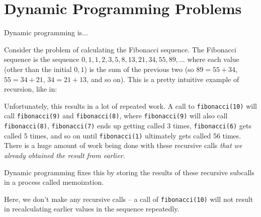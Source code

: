 \section{Dynamic Programming Problems}

Dynamic programming is...

Consider the problem of calculating the Fibonacci sequence. The Fibonacci sequence is the sequence $0,1,1,2,3,5,8,13,21,34,55,89,...$ where each value (other than the initial $0,1$) is the sum of the previous two (so $89 = 55 + 34$, $55 = 34 + 21$, $34 = 21 + 13$, and so on). This is a pretty intuitive example of recursion, like in:


Unfortunately, this results in a lot of repeated work. A call to \texttt{fibonacci(10)} will call \texttt{fibonacci(9)} and \texttt{fibonacci(8)}, where \texttt{fibonacci(9)} will also call \texttt{fibonacci(8)}, \texttt{fibonacci(7)} ends up getting called 3 times, \texttt{fibonacci(6)} gets called 5 times, and so on until \texttt{fibonacci(1)} ultimately gets called 56 times. There is a huge amount of work being done with these recursive calls \textit{that we already obtained the result from earlier}.

Dynamic programming fixes this by storing the results of these recursive subcalls in a process called memoization.


Here, we don't make any recursive calls -- a call of \texttt{fibonacci(10)} will not result in recalculating earlier values in the sequence repeatedly.
